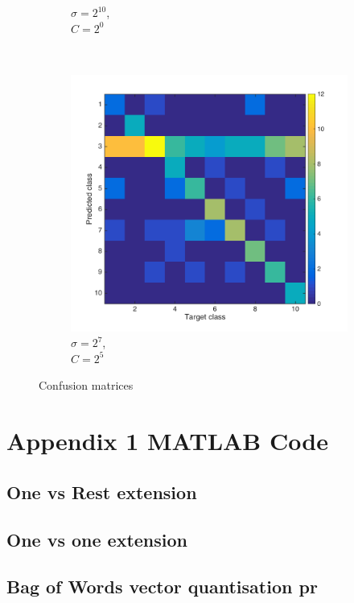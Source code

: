 \documentclass[10pt,twocolumn,letterpaper]{article}
\begin{document}
\begin{figure}
\begin{subfigure}[H]{0.3 \columnwidth}
		\caption{$\sigma = 2^{10}$, \\$C = 2^0$}
	\end{subfigure}
	~
	\begin{subfigure}[H]{0.3 \columnwidth}
		\includegraphics[width = 1\columnwidth]{q3_confmat3}
		\caption{$\sigma = 2^{7}$, \\$C = 2^5$}
	\end{subfigure}
		
	\caption{Confusion matrices}
	\label{fig:q3_confmat}
\end{figure}




{\small


}

\onecolumn
\appendix
\section{Appendix 1 MATLAB Code}
\subsection{One vs Rest extension}


\subsection{One vs one extension}


\subsection{Bag of Words vector quantisation pr}

\end{document}
